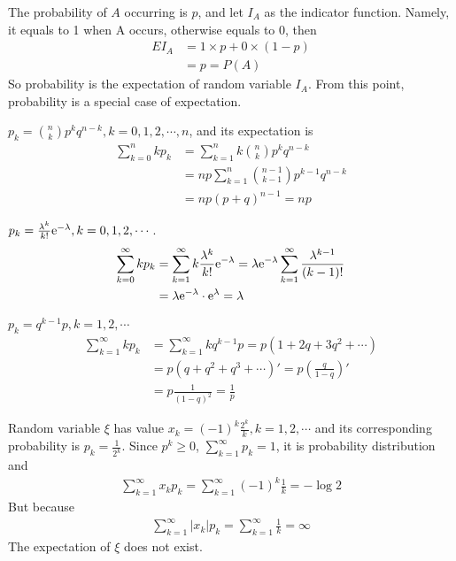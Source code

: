 \begin{exa}
    The probability of $A$ occurring is $p$, and let $I_A$ as the indicator function. Namely, it equals to 1 when A occurs, otherwise equals to 0, then
    \begin{align*}
        E I_A &= 1 \times p + 0 \times (1-p)\\
        &= p = P(A)
    \end{align*}
    So probability is the expectation of random variable $I_A$. From this point, probability is a special case of expectation.
\end{exa}

\begin{exa}
$p_k=\binom{n}{k}p^kq^{n-k},k=0,1,2,\cdots,n$, 
and its expectation is
\begin{align}
    \sum_{k=0}^n kp_k &= \sum_{k=1}^n k \binom{n}{k}p^kq^{n-k} \nonumber\\
    &= np\sum_{k=1}^n \binom{n-1}{k-1}p^{k-1}q^{n-k} \nonumber\\
    &= np (p+q)^{n-1}=np
\end{align}
\end{exa}

\begin{exa} $p_k=\frac{\lambda^k}{k!}{\rm e}^{-\lambda},k=0,1,2,\cdots$.
\begin{align}
\sum_{k=0}^\infty kp_k &= \sum_{k=1}^\infty k\frac{\lambda^k}{k!} {\rm e}^{-\lambda} =\lambda {\rm e}^{-\lambda}\sum_{k=1}^\infty\frac{\lambda^{k-1}}{(k-1)!} \nonumber\\
&=\lambda {\rm e}^{-\lambda} \cdot {\rm e}^{\lambda} =\lambda 
\end{align}
\end{exa}

\begin{exa}
$p_k=q^{k-1}p,k=1,2,\cdots$
\begin{align}
    \sum_{k=1}^\infty kp_k &= \sum_{k=1}^\infty kq^{k-1}p=p(1+2q+3q^2+\cdots) \nonumber\\
    &=p(q+q^2+q^3+\cdots)' = p(\frac{q}{1-q})'\nonumber\\
    &=p \frac{1}{(1-q)^2} = \frac{1}{p}
\end{align}
\end{exa}

\begin{exa}
    Random variable $\xi$ has value $x_k=(-1)^k \frac{2^k}{k},k=1,2,\cdots$ and its corresponding probability is $p_k=\frac{1}{2^k}$. Since $p^k\geq 0$, $\sum_{k=1}^\infty p_k =1$, it is probability distribution and
    \begin{align*}
        \sum_{k=1}^\infty x_kp_k = \sum_{k=1}^\infty (-1)^k \frac{1}{k} = - \log 2
    \end{align*}
    But because 
    \begin{align*}
        \sum_{k=1}^\infty |x_k|p_k =  \sum_{k=1}^\infty \frac{1}{k} = \infty
    \end{align*}
    The expectation of $\xi$ does not exist.
\end{exa}

